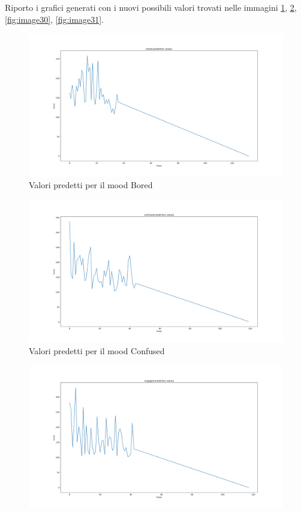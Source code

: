 \begin {itemize}
Riporto i grafici generati con i nuovi possibili valori trovati nelle immagini \ref{fig:image28}, \ref{fig:image29}, \ref{fig:image30}, \ref{fig:image31}.
\begin{figure}
    \begin{center}    
        \includegraphics[width=1\linewidth]{images/bored prediction values.png}
        \caption{Valori predetti per il mood Bored}
        \label{fig:image28}
    \end{center}
\end{figure}
\begin{figure}
    \begin{center}    
        \includegraphics[width=1\linewidth]{images/confused prediction values.png}
        \caption{Valori predetti per il mood Confused}
        \label{fig:image29}
    \end{center}
\end{figure}\clearpage
\begin{figure}
    \begin{center}    
        \includegraphics[width=1\linewidth]{images/engaged prediction values.png}

\end{center}
\end{figure}
\end{itemize}
